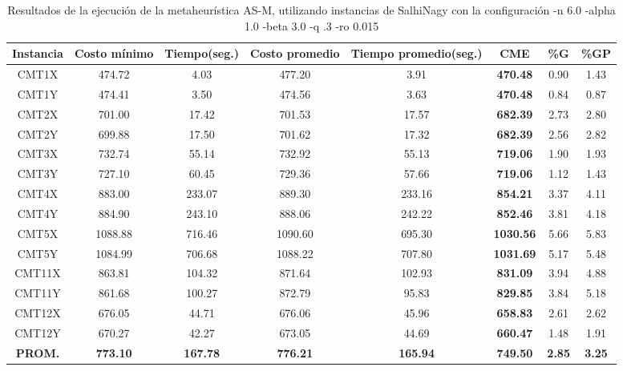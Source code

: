 \begin{table}[h]
\caption{Resultados de la ejecución de la metaheurística AS-M, utilizando instancias de SalhiNagy con la configuración -n 6.0 -alpha 1.0 -beta 3.0 -q .3 -ro 0.015}
\centering
\small
\begin{tabular}{c c c c c c c c}
\hline\hline
Instancia & Costo mínimo & Tiempo(seg.) & Costo promedio & Tiempo promedio(seg.) & CME & \%G & \%GP \\ [0.5ex]
\hline
CMT1X & 474.72 & 4.03 & 
477.20 & 3.91 & \bf{470.48} & 
0.90 & 1.43\\CMT1Y & 474.41 & 3.50 & 
474.56 & 3.63 & \bf{470.48} & 
0.84 & 0.87\\CMT2X & 701.00 & 17.42 & 
701.53 & 17.57 & \bf{682.39} & 
2.73 & 2.80\\CMT2Y & 699.88 & 17.50 & 
701.62 & 17.32 & \bf{682.39} & 
2.56 & 2.82\\CMT3X & 732.74 & 55.14 & 
732.92 & 55.13 & \bf{719.06} & 
1.90 & 1.93\\CMT3Y & 727.10 & 60.45 & 
729.36 & 57.66 & \bf{719.06} & 
1.12 & 1.43\\CMT4X & 883.00 & 233.07 & 
889.30 & 233.16 & \bf{854.21} & 
3.37 & 4.11\\CMT4Y & 884.90 & 243.10 & 
888.06 & 242.22 & \bf{852.46} & 
3.81 & 4.18\\CMT5X & 1088.88 & 716.46 & 
1090.60 & 695.30 & \bf{1030.56} & 
5.66 & 5.83\\CMT5Y & 1084.99 & 706.68 & 
1088.22 & 707.80 & \bf{1031.69} & 
5.17 & 5.48\\CMT11X & 863.81 & 104.32 & 
871.64 & 102.93 & \bf{831.09} & 
3.94 & 4.88\\CMT11Y & 861.68 & 100.27 & 
872.79 & 95.83 & \bf{829.85} & 
3.84 & 5.18\\CMT12X & 676.05 & 44.71 & 
676.06 & 45.96 & \bf{658.83} & 
2.61 & 2.62\\CMT12Y & 670.27 & 42.27 & 
673.05 & 44.69 & \bf{660.47} & 
1.48 & 1.91\\\bf{PROM.} & 
\bf{773.10} & \bf{167.78} & \bf{776.21} & \bf{165.94} & \bf{749.50} & \bf{2.85} & \bf{3.25}\\[1ex]\hline
\end{tabular}
\label{table:nonlin}
\end{table}
